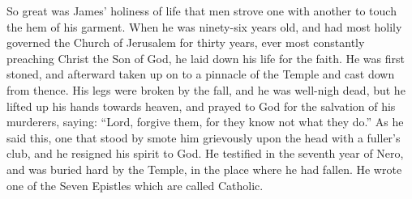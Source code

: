 So great was James’ holiness of life that men strove one with another to touch the hem of his garment. When he was ninety-six years old, and had most holily governed the Church of Jerusalem for thirty years, ever most constantly preaching Christ the Son of God, he laid down his life for the faith. He was first stoned, and afterward taken up on to a pinnacle of the Temple and cast down from thence. His legs were broken by the fall, and he was well-nigh dead, but he lifted up his hands towards heaven, and prayed to God for the salvation of his murderers, saying: “Lord, forgive them, for they know not what they do.” As he said this, one that stood by smote him grievously upon the head with a fuller’s club, and he resigned his spirit to God. He testified in the seventh year of Nero, and was buried hard by the Temple, in the place where he had fallen. He wrote one of the Seven Epistles which are called Catholic.
